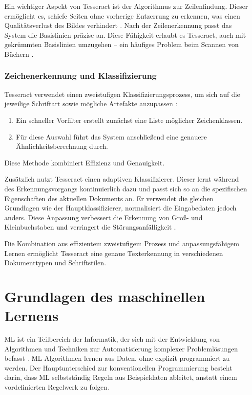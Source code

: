 Ein wichtiger Aspekt von Tesseract ist der Algorithmus zur Zeilenfindung. Dieser ermöglicht es, schiefe Seiten ohne vorherige Entzerrung zu erkennen, was einen Qualitätsverlust des Bildes verhindert \cite{SmithR_2007_AOot}. Nach der Zeilenerkennung passt das System die Basislinien präzise an. Diese Fähigkeit erlaubt es Tesseract, auch mit gekrümmten Basislinien umzugehen – ein häufiges Problem beim Scannen von Büchern \cite{SmithR_2007_AOot}.

\subsubsection{Zeichenerkennung und Klassifizierung}
\label{subsubsec:zeichenerkennung-und-klassifizierung}

Tesseract verwendet einen zweistufigen Klassifizierungsprozess, um sich auf die jeweilige Schriftart sowie mögliche Artefakte anzupassen \cite{SmithR_2007_AOot}:

\begin{enumerate}
	\item Ein schneller Vorfilter erstellt zunächst eine Liste möglicher Zeichenklassen.
	\item Für diese Auswahl führt das System anschließend eine genauere Ähnlichkeitsberechnung durch.
\end{enumerate}

Diese Methode kombiniert Effizienz und Genauigkeit. 

Zusätzlich nutzt Tesseract einen adaptiven Klassifizierer. Dieser lernt während des Erkennungsvorgangs kontinuierlich dazu und passt sich so an die spezifischen Eigenschaften des aktuellen Dokuments an. Er verwendet die gleichen Grundlagen wie der Hauptklassifizierer, normalisiert die Eingabedaten jedoch anders. Diese Anpassung verbessert die Erkennung von Groß- und Kleinbuchstaben und verringert die Störungsanfälligkeit \cite{SmithR_2007_AOot}.

Die Kombination aus effizientem zweistufigem Prozess und anpassungsfähigem Lernen ermöglicht Tesseract eine genaue Texterkennung in verschiedenen Dokumenttypen und Schriftstilen.

\section{Grundlagen des maschinellen Lernens}
\label{sec:grundlagen-des-maschinellen-lernens}

\gls{ML} ist ein Teilbereich der Informatik, der sich mit der Entwicklung von Algorithmen und Techniken zur Automatisierung komplexer Problemlösungen befasst \cite{RebalaGopinath2019AItM}. \gls{ML}-Algorithmen lernen aus Daten, ohne explizit programmiert zu werden. Der Hauptunterschied zur konventionellen Programmierung besteht darin, dass \gls{ML} selbstständig Regeln aus Beispieldaten ableitet, anstatt einem vordefinierten Regelwerk zu folgen.

